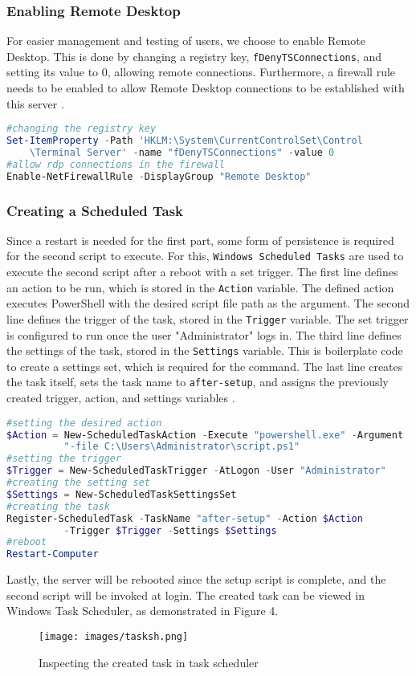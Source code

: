 \documentclass[a4paper]{article}
\newcommand{\abc}{\hfill \break}
\begin{document}
\subsubsection{Enabling Remote Desktop}  
For easier management and testing of users, we choose to enable Remote Desktop. \abc
This is done by changing a registry key, \texttt{fDenyTSConnections}, and setting its value to 0, allowing remote connections. \abc
Furthermore, a firewall rule needs to be enabled to allow Remote Desktop connections to be established with this server \cite{Enable-Remote-Dekstop}.
\begin{lstlisting}[language=PowerShell]
#changing the registry key
Set-ItemProperty -Path 'HKLM:\System\CurrentControlSet\Control
	\Terminal Server' -name "fDenyTSConnections" -value 0
#allow rdp connections in the firewall
Enable-NetFirewallRule -DisplayGroup "Remote Desktop"
\end{lstlisting}

\newpage
\subsubsection{Creating a Scheduled Task}
Since a restart is needed for the first part, some form of persistence is required for the second script to execute. For this, \texttt{Windows Scheduled Tasks} are used to execute the second script after a reboot with a set trigger.\abc \abc
The first line defines an action to be run, which is stored in the \texttt{Action} variable. The defined action executes PowerShell with the desired script file path as the argument. \abc
The second line defines the trigger of the task, stored in the \texttt{Trigger} variable. The set trigger is configured to run once the user "Administrator" logs in. \abc
The third line defines the settings of the task, stored in the \texttt{Settings} variable. This is boilerplate code to create a settings set, which is required for the command. \abc
The last line creates the task itself, sets the task name to \texttt{after-setup}, and assigns the previously created trigger, action, and settings variables \cite{New-ScheduledTask}.
\begin{lstlisting}[language=PowerShell]
#setting the desired action
$Action = New-ScheduledTaskAction -Execute "powershell.exe" -Argument 
          "-file C:\Users\Administrator\script.ps1"
#setting the trigger
$Trigger = New-ScheduledTaskTrigger -AtLogon -User "Administrator"
#creating the setting set
$Settings = New-ScheduledTaskSettingsSet
#creating the task
Register-ScheduledTask -TaskName "after-setup" -Action $Action 
          -Trigger $Trigger -Settings $Settings
#reboot
Restart-Computer
\end{lstlisting}
Lastly, the server will be rebooted since the setup script is complete, and the second script will be invoked at login.\abc
The created task can be viewed in Windows Task Scheduler, as demonstrated in Figure 4.
\begin{figure}[h]
	\texttt{[image: images/tasksh.png]}
	\centering
	\caption{Inspecting the created task in task scheduler}
\end{figure}\newpage
\newpage
\end{document}
